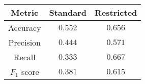 \begin{tabular}{ccc}
    \textbf{Metric}  & \textbf{Standard} & \textbf{Restricted} \\\hline
    Accuracy         & $0.552$           & $\mathbf{0.656}$                \\
    Precision        & $0.444$           & $\mathbf{0.571}$                \\
    Recall           & $0.333$           & $\mathbf{0.667}$                \\
    $F_1$ score      & $0.381$           & $\mathbf{0.615}$
\end{tabular}

